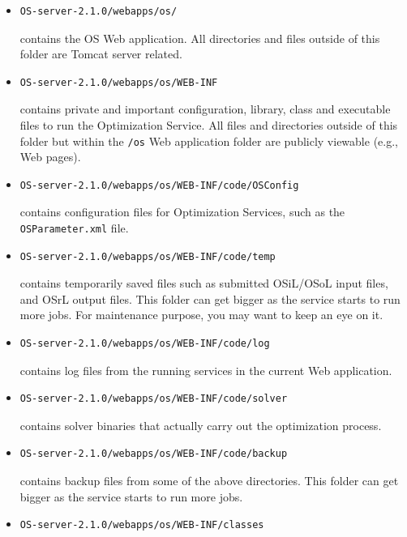 \documentclass[11pt]{article}
\renewcommand{\_}{{\char"5F}}
\renewcommand{\{}{{\char"7B}}
\renewcommand{\}}{{\char"7D}}
\renewcommand{\^}{{\char"0D}}
\renewcommand{\'}{{\char"0D}}
\begin{document}
\begin{enumerate}[Step 1:]
\begin{itemize}
\item
\begin{verbatim}
OS-server-2.1.0/webapps/os/
\end{verbatim}
contains the OS Web application. All directories and files outside of this folder are Tomcat server related.
\item
\begin{verbatim}
OS-server-2.1.0/webapps/os/WEB-INF
\end{verbatim}
contains private and important configuration, library, class and executable files to run the Optimization Service.
All files and directories outside of this folder but within the {\tt /os} Web application folder are publicly viewable (e.g., Web pages).
\item
\begin{verbatim}
OS-server-2.1.0/webapps/os/WEB-INF/code/OSConfig
\end{verbatim}
contains configuration files for Optimization Services, such as the {\tt OSParameter.xml} file.
\item
\begin{verbatim}
OS-server-2.1.0/webapps/os/WEB-INF/code/temp
\end{verbatim}
contains temporarily saved files such as submitted OSiL/OSoL input files, and OSrL output files. This folder can get bigger as the service starts to run more jobs. For maintenance purpose, you may want to keep an eye on it.
\item
\begin{verbatim}
OS-server-2.1.0/webapps/os/WEB-INF/code/log
\end{verbatim}
contains log files from the running services in the current Web application.
\item
\begin{verbatim}
OS-server-2.1.0/webapps/os/WEB-INF/code/solver
\end{verbatim}
contains solver binaries that actually carry out the optimization process.
\item
\begin{verbatim}
OS-server-2.1.0/webapps/os/WEB-INF/code/backup
\end{verbatim}
contains backup files from some of the above directories. This folder can get bigger as the service starts to run more jobs.
\item
\begin{verbatim}
OS-server-2.1.0/webapps/os/WEB-INF/classes
\end{verbatim}

\end{itemize}
\end{enumerate}
\end{document}
